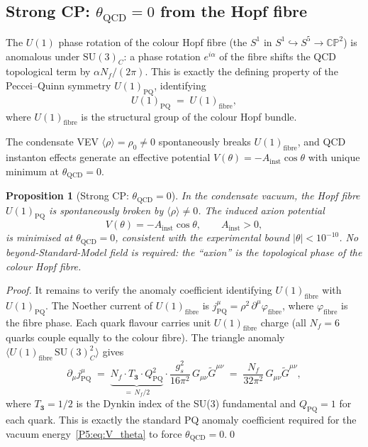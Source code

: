 \documentclass[11pt,a4paper]{article}
\newtheorem{proposition}[theorem]{Proposition}
\theoremstyle{definition}
\theoremstyle{remark}
\begin{document}
\subsection{Strong CP: $\theta_{\mathrm{QCD}}=0$ from the Hopf fibre}
\label{P5:sec:strongCP}

The $U(1)$ phase rotation of the colour Hopf fibre
(the $S^1$ in $S^1\hookrightarrow S^5\to\mathbb{CP}^2$)
is anomalous under $\mathrm{SU}(3)_C$: a phase rotation
$e^{i\alpha}$ of the fibre shifts the QCD topological term by
$\alpha N_f/(2\pi)$.
This is exactly the defining property of the Peccei--Quinn symmetry
$U(1)_{\mathrm{PQ}}$, identifying
\begin{equation}
  U(1)_{\mathrm{PQ}} \;=\; U(1)_{\mathrm{fibre}},
  \label{P5:eq:PQ_fiber}
\end{equation}
where $U(1)_{\mathrm{fibre}}$ is the structural group of the colour
Hopf bundle.

The condensate VEV $\langle\rho\rangle=\rho_0\neq0$ spontaneously
breaks $U(1)_{\mathrm{fibre}}$, and QCD instanton effects generate
an effective potential $V(\theta)=-A_{\mathrm{inst}}\cos\theta$
with unique minimum at $\theta_{\mathrm{QCD}}=0$.

\begin{proposition}[Strong CP: $\theta_{\mathrm{QCD}}=0$]
\label{P5:prop:strongCP}
\label{P5:prop:theta_Z3}
In the condensate vacuum, the Hopf fibre $U(1)_{\mathrm{PQ}}$
is spontaneously broken by $\langle\rho\rangle\neq0$.
The induced axion potential
\begin{equation}
  V(\theta) = -A_{\mathrm{inst}}\cos\theta, \qquad A_{\mathrm{inst}}>0,
  \label{P5:eq:V_theta}
\end{equation}
is minimised at $\theta_{\mathrm{QCD}}=0$, consistent with the experimental
bound $|\theta|<10^{-10}$.
No beyond-Standard-Model field is required: the ``axion'' is the
topological phase of the colour Hopf fibre.
\end{proposition}

\begin{proof}
It remains to verify the anomaly coefficient identifying
$U(1)_{\mathrm{fibre}}$ with $U(1)_{\mathrm{PQ}}$.
The Noether current of $U(1)_{\mathrm{fibre}}$ is
$j_{\mathrm{PQ}}^\mu = \rho^2\,\partial^\mu\varphi_{\mathrm{fibre}}$,
where $\varphi_{\mathrm{fibre}}$ is the fibre phase.
Each quark flavour carries unit $U(1)_{\mathrm{fibre}}$ charge
(all $N_f=6$ quarks couple equally to the colour fibre).
The triangle anomaly $\langle U(1)_{\mathrm{fibre}}\,\mathrm{SU}(3)_C^2\rangle$
gives
\begin{equation}
  \partial_\mu j_{\mathrm{PQ}}^\mu
  \;=\; \underbrace{N_f \cdot T_{\mathbf{3}} \cdot Q_{\mathrm{PQ}}^2}_{=\,N_f/2}
        \cdot \frac{g_s^2}{16\pi^2}\,G_{\mu\nu}\widetilde{G}^{\mu\nu}
  \;=\; \frac{N_f}{32\pi^2}\,G_{\mu\nu}\widetilde{G}^{\mu\nu},
  \label{P5:eq:PQ_anomaly}
\end{equation}
where $T_{\mathbf{3}}=1/2$ is the Dynkin index of the SU(3) fundamental
and $Q_{\mathrm{PQ}}=1$ for each quark.
This is exactly the standard PQ anomaly coefficient required
for the vacuum energy~\eqref{P5:eq:V_theta} to force
$\theta_{\mathrm{QCD}}=0$.\qed
\end{proof}
\end{document}
